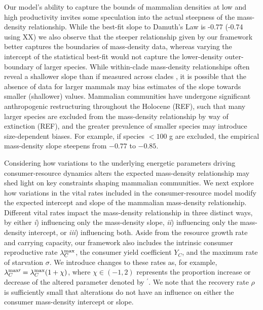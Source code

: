 \documentclass[]{rsos}%
\begin{document}
Our model's ability to capture the bounds of mammalian densities at low and high productivity invites some speculation into the actual steepness of the mass-density relationship.
While the best-fit slope to Damuth's Law is -0.77 (-0.74 using XX) we also observe that the steeper relationship given by our framework better captures the boundaries of mass-density data, whereas varying the intercept of the statistical best-fit would not capture the lower-density outer-boundary of larger species. %
While within-clade mass-density relationships often reveal a shallower slope than if measured across clades \cite{Pedersen:2017he}, it is possible that the absence of data for larger mammals may bias estimates of the slope towards smaller (shallower) values.
Mammalian communities have undergone significant anthropogenic restructuring throughout the Holocene (REF), such that many larger species are excluded from the mass-density relationship by way of extinction (REF), and the greater prevalence of smaller species may introduce size-dependent biases.
For example, if species $<100$ g are excluded, the empirical mass-density slope steepens from $-0.77$ to $-0.85$.

Considering how variations to the underlying energetic parameters driving consumer-resource dynamics alters the expected mass-density relationship may shed light on key constraints shaping mammalian communities. 
We next explore how variations in the vital rates included in the consumer-resource model modify the expected intercept and slope of the mammalian mass-density relationship.
Different vital rates impact the mass-density relationship in three distinct ways, by either \emph{i}) influencing only the mass-density slope, \emph{ii}) influencing only the mass-density intercept, or \emph{iii}) influencing both.
Aside from the resource growth rate and carrying capacity, our framework also includes the intrinsic consumer reproductive rate $\lambda^{\rm max}_C$, the consumer yield coefficient $Y_C$, and the maximum rate of starvation $\sigma$.
We introduce changes to these rates as, for example, $\lambda^{\rm max\prime}_C = \lambda^{\rm max}_C(1+\chi)$, where $\chi \in (-1,2)$ represents the proportion increase or decrease of the altered parameter denoted by ${}^\prime$.
We note that the recovery rate $\rho$ is sufficiently small that alterations do not have an influence on either the consumer mass-density intercept or slope.
\end{document}
